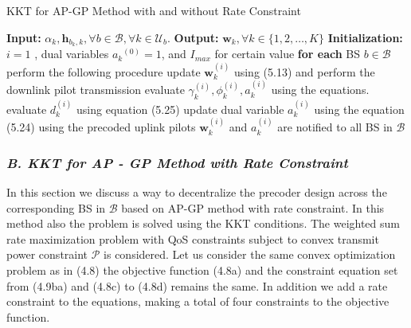 \documentclass[a4paper, 12pt,titlepage]{dithesis} %
\newcommand{\me}[1]{\( #1 \)}
\begin{document}
\begin{algorithm}
	\caption[Distributed Precoder Design]{KKT for AP-GP Method with and without Rate Constraint}
	\label{algo-2}
	\begin{algorithmic}
		\label{algo--2}
		\STATE \textbf{Input:} \me{\alpha_k, \mathbf{h}_{b_k,k}, \forall b \in \mathcal{B}, \forall k \in \mathcal{U}_b}.
		\STATE \textbf{Output:} \me{\mathbf{w}_k, \forall k \in \lbrace{1,2,\dotsc,K \rbrace}}
		\STATE \textbf{Initialization:} \me{i = 1} , dual variables	\me{{a_k}^{(0)} = 1}, and \me{I_{max}} for certain value
		\REPEAT
		\STATE \textbf{for each} \ac{BS} \me{b \in \mathcal{B}} perform the following procedure
		\STATE update \me{\mathbf{w}_k^{(i)}} using (5.13) and perform the downlink pilot transmission
		\STATE evaluate \me{\gamma_k^{(i)}, \phi_k^{(i)}, a_k^{(i)}} using the equations. 
		\STATE evaluate \me{d_k^{(i)}} using equation (5.25)
		\STATE update dual variable \me{a_k^{(i)}} using the equation (5.24)
		\ENDIF
		\STATE using the precoded uplink pilots \me{\mathbf{w}_k^{(i)}} and \me{a_k^{(i)}} are notified to all \ac{BS} in \me{\mathcal{B}}
		\UNTIL {convergence or \me{i \geq I_{max}}}\\
	\end{algorithmic} 
\end{algorithm}


\subsubsection*{\textit{B. KKT for AP - GP Method with Rate Constraint}}

In this section we discuss a way to decentralize the precoder design across the corresponding \ac{BS} in \me{\mathcal{B}} based on AP-GP method with rate constraint. In this method also the problem is solved using the \ac{KKT} conditions. The weighted sum rate maximization problem with \ac{QoS} constraints subject to convex transmit power constraint \me{\mathcal{P}} is considered. Let us consider the same convex optimization problem as in (4.8) the objective function (4.8a) and the constraint equation set from (4.9ba) and (4.8c) to (4.8d) remains the same. In addition we add a rate constraint to the equations, making a total of four constraints to the objective function.
\end{document}
